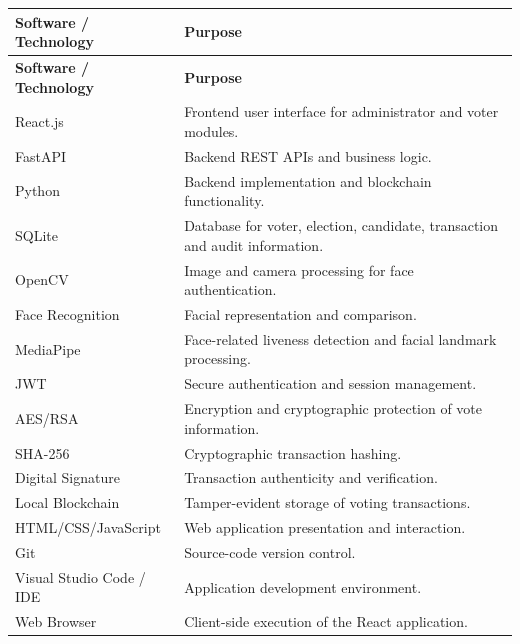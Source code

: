 \documentclass[12pt,a4paper]{report}
\begin{document}
\begin{longtable}{|>{\raggedright\arraybackslash}p{5cm}|
                  >{\raggedright\arraybackslash}p{9.5cm}|}

\hline
\textbf{Software / Technology} & \textbf{Purpose} \\
\hline
\endfirsthead

\hline
\textbf{Software / Technology} & \textbf{Purpose} \\
\hline
\endhead

React.js
& Frontend user interface for administrator and voter modules. \\
\hline

FastAPI
& Backend REST APIs and business logic. \\
\hline

Python
& Backend implementation and blockchain functionality. \\
\hline

SQLite
& Database for voter, election, candidate, transaction and audit information. \\
\hline

OpenCV
& Image and camera processing for face authentication. \\
\hline

Face Recognition
& Facial representation and comparison. \\
\hline

MediaPipe
& Face-related liveness detection and facial landmark processing. \\
\hline

JWT
& Secure authentication and session management. \\
\hline

AES/RSA
& Encryption and cryptographic protection of vote information. \\
\hline

SHA-256
& Cryptographic transaction hashing. \\
\hline

Digital Signature
& Transaction authenticity and verification. \\
\hline

Local Blockchain
& Tamper-evident storage of voting transactions. \\
\hline

HTML/CSS/JavaScript
& Web application presentation and interaction. \\
\hline

Git
& Source-code version control. \\
\hline

Visual Studio Code / IDE
& Application development environment. \\
\hline

Web Browser
& Client-side execution of the React application. \\
\hline

\end{longtable}
\end{document}
